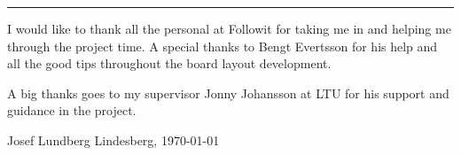 \vspace{-10ex}%
\rule{\textwidth}{0.3pt}
\vspace{5ex}


I would like to thank all the personal at Followit for taking me in and helping me through the project time. A special thanks to Bengt Evertsson for his help and all the good tips throughout the board layout development. 

A big thanks goes to my supervisor Jonny Johansson at LTU for his support and guidance in the project.

\begin{flushright}
Josef Lundberg
\newline
Lindesberg, \today
\end{flushright}

\begin{comment}
- Rätta till bilden med VHF skalan
- Räkna och visa den koplexa polerna mm för chebychev


\end{comment}

